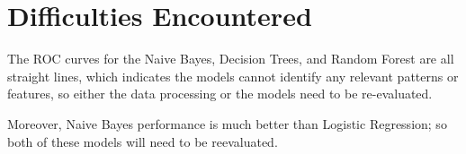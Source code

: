 \section{Difficulties Encountered}

The ROC curves for the Naive Bayes, Decision Trees, and Random Forest are all straight lines, which indicates the models cannot identify any relevant patterns or features, so either the data processing or the models need to be re-evaluated.

Moreover, Naive Bayes performance is much better than Logistic Regression; so both of these models will need to be reevaluated.